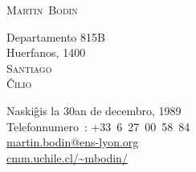\documentclass[12pt,a4paper]{article}
\begin{document}
\pagestyle{empty}


\newlength{\annee}
\settowidth{\annee}{9999--9999}


\newlength{\texte}
\setlength{\texte}{\textwidth} \addtolength{\texte}{-\annee} 
	\addtolength{\texte}{-2\tabcolsep}

\begin{center} \Huge \textsc{Martin~Bodin} \end{center}

\parbox[c]{.5\textwidth}
{
  \noindent
  Departamento 815B \\
  Huerfanos, 1400 \\
  \textsc{Santiago} \\
  \textsc{Ĉilio}
}
\parbox[c]{.55\textwidth}
{
\begin{flushright}
  Naskiĝis la 30an de decembro, 1989 \\
  \noindent Telefonnumero~: \mbox{+33 6 27 00 58 84} \\
  \url{martin.bodin@ens-lyon.org} \\
  \url{cmm.uchile.cl/~mbodin/}
\end{flushright}
}
\end{document}
